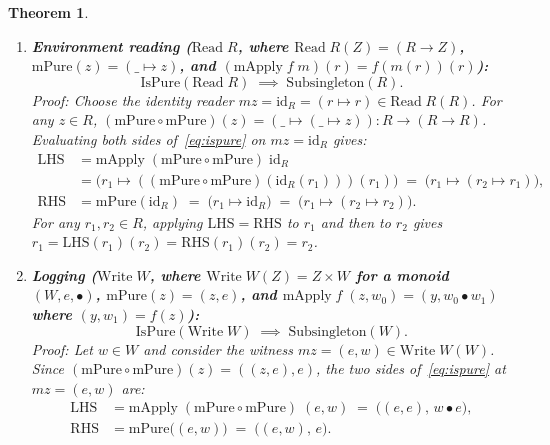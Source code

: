 \documentclass[11pt,a4paper]{article}
\newtheorem{theorem}{Theorem}[section]
\theoremstyle{definition}
\theoremstyle{remark}
\newcommand{\id}{\mathrm{id}}
\newcommand{\ttstar}{\mathrm{tt}^*}
\begin{document}
\begin{theorem}
\begin{enumerate}[label=(\arabic*),nosep]
\[    \qquad
    \mathrm{mPure}\bigl([\ttstar, \ttstar]\bigr)
    \;=\; \bigl[[\ttstar, \ttstar]\bigr].
  \]
  Equating the two lists in $\mathrm{List}(\mathrm{List}(T))$ and taking the tail (or comparing lengths
  $2 \neq 1$) yields $[[\ttstar]] = []$, a contradiction.
  \vspace{4pt}
  \item \textbf{Environment reading ($\mathrm{Read}\;R$, where $\mathrm{Read}\;R(Z) = (R \to Z)$,
  $\mathrm{mPure}(z) = (\_ \mapsto z)$, and $(\mathrm{mApply}\;f\;m)(r) = f(m(r))(r)$):}
  \[
    \mathrm{IsPure}(\mathrm{Read}\;R) \;\implies\; \mathrm{Subsingleton}(R).
  \]
  \emph{Proof:} Choose the identity reader $mz = \id_R = (r \mapsto r) \in \mathrm{Read}\;R(R)$. For
  any $z \in R$, $(\mathrm{mPure} \circ \mathrm{mPure})(z) = (\_ \mapsto (\_ \mapsto z)) : R \to (R \to R)$.
  Evaluating both sides of~\eqref{eq:ispure} on $mz = \id_R$ gives:
  \begin{align*}
    \mathrm{LHS}
    &= \mathrm{mApply}\;(\mathrm{mPure} \circ \mathrm{mPure})\;\id_R \\
    &= \bigl(r_1 \mapsto ((\mathrm{mPure} \circ \mathrm{mPure})(\id_R(r_1)))(r_1)\bigr)
     \;=\; \bigl(r_1 \mapsto (r_2 \mapsto r_1)\bigr), \\
    \mathrm{RHS}
    &= \mathrm{mPure}(\id_R)
     \;=\; \bigl(r_1 \mapsto \id_R\bigr)
     \;=\; \bigl(r_1 \mapsto (r_2 \mapsto r_2)\bigr).
  \end{align*}
  For any $r_1, r_2 \in R$, applying $\mathrm{LHS} = \mathrm{RHS}$ to $r_1$ and then to $r_2$ gives
  $r_1 = \mathrm{LHS}(r_1)(r_2) = \mathrm{RHS}(r_1)(r_2) = r_2$.
  \vspace{4pt}
  \item \textbf{Logging ($\mathrm{Write}\;W$, where $\mathrm{Write}\;W(Z) = Z \times W$ for a monoid
  $(W, e, \bullet)$, $\mathrm{mPure}(z) = (z, e)$, and $\mathrm{mApply}\;f\;(z, w_0) = (y, w_0 \bullet w_1)$
  where $(y, w_1) = f(z)$):}
  \[
    \mathrm{IsPure}(\mathrm{Write}\;W) \;\implies\; \mathrm{Subsingleton}(W).
  \]
  \emph{Proof:} Let $w \in W$ and consider the witness $mz = (e, w) \in \mathrm{Write}\;W(W)$. Since
  $(\mathrm{mPure} \circ \mathrm{mPure})(z) = ((z, e), e)$, the two sides of~\eqref{eq:ispure} at
  $mz = (e, w)$ are:
  \begin{align*}
    \mathrm{LHS} &= \mathrm{mApply}\;(\mathrm{mPure} \circ \mathrm{mPure})\;(e, w) \;=\; \bigl((e, e),\, w \bullet e\bigr), \\
    \mathrm{RHS} &= \mathrm{mPure}\bigl((e, w)\bigr) \;=\; \bigl((e, w),\, e\bigr).
  \end{align*}

\end{enumerate}
\end{theorem}
\end{document}

